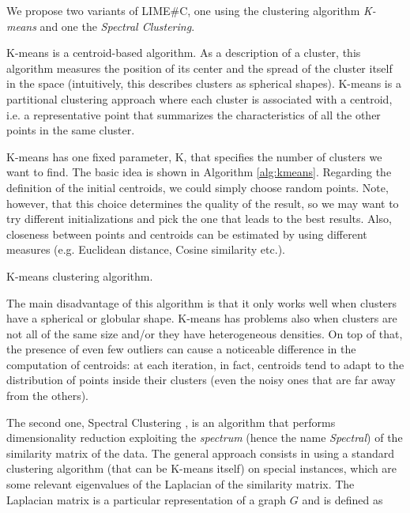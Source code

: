 \documentclass[12pt, twoside, a4paper]{report}
\begin{document}
We propose two variants of LIME\#C, one using the clustering algorithm \textit{K-means} and one the \textit{Spectral Clustering}.

K-means \cite{k-means} is a centroid-based algorithm. As a description of a cluster, this algorithm measures the position of its center and the spread of the cluster itself in the space (intuitively, this describes clusters as spherical shapes).
K-means is a partitional clustering approach where each cluster is associated with a centroid, i.e. a representative point that summarizes the characteristics of all the other points in the same cluster. 

K-means has one fixed parameter, K, that specifies the number of clusters we want to find. The basic idea is shown in Algorithm \ref{alg:kmeans}. Regarding the definition of the initial centroids, we could simply choose random points. Note, however, that this choice determines the quality of the result, so we may want to try different initializations and pick the one that leads to the best results. 
Also, closeness between points and centroids can be estimated by using different measures (e.g. Euclidean distance, Cosine similarity etc.).

\LinesNumbered
{}


\begin{algorithm}
\caption{K-means clustering algorithm.}
\label{alg:kmeans}
\end{algorithm}

The main disadvantage of this algorithm is that it only works well when clusters have a spherical or globular shape. K-means has problems also when clusters are not all of the same size and/or they have heterogeneous densities. On top of that, the presence of even few outliers can cause a noticeable difference in the computation of centroids: at each iteration, in fact, centroids tend to adapt to the distribution of points inside their clusters (even the noisy ones that are far away from the others).

\bigskip

The second one, Spectral Clustering \cite{on-spectral-clus,spectral_clustering, spectral-tutorial}, is an algorithm that performs dimensionality reduction exploiting the \textit{spectrum} (hence the name \textit{Spectral}) of the similarity matrix of the data. The general approach consists in using a standard clustering algorithm (that can be K-means itself) on special instances, which are some relevant eigenvalues of the Laplacian of the similarity matrix. The Laplacian matrix is a particular representation of a graph $G$ and is defined as 
\end{document}

